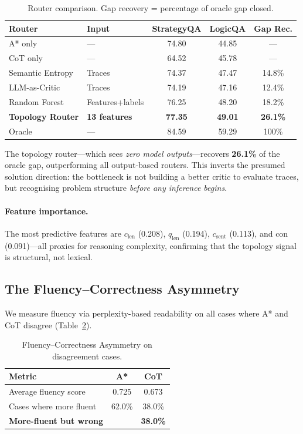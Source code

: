 \documentclass[11pt]{article}
\begin{document}
\begin{table}[t]
\centering
\caption{Router comparison. Gap recovery = percentage of oracle gap closed.}
\label{tab:router}
\small
\begin{tabular}{@{}llccc@{}}
\toprule
\textbf{Router} & \textbf{Input} & \textbf{StrategyQA} & \textbf{LogicQA} & \textbf{Gap Rec.} \\
\midrule
A* only & --- & 74.80 & 44.85 & --- \\
CoT only & --- & 64.52 & 45.78 & --- \\
\midrule
Semantic Entropy & Traces & 74.37 & 47.47 & 14.8\% \\
LLM-as-Critic & Traces & 74.19 & 47.16 & 12.4\% \\
Random Forest & Features+labels & 76.25 & 48.20 & 18.2\% \\
\textbf{Topology Router} & \textbf{13 features} & \textbf{77.35} & \textbf{49.01} & \textbf{26.1\%} \\
\midrule
Oracle & --- & 84.59 & 59.29 & 100\% \\
\bottomrule
\end{tabular}
\end{table}

The topology router---which sees \emph{zero model outputs}---recovers \textbf{26.1\%} of the oracle gap, outperforming all output-based routers. This inverts the presumed solution direction: the bottleneck is not building a better critic to evaluate traces, but recognising problem structure \emph{before any inference begins}.

\paragraph{Feature importance.}
The most predictive features are $c_\text{len}$ (0.208), $q_\text{len}$ (0.194), $c_\text{sent}$ (0.113), and $\mathrm{con}$ (0.091)---all proxies for reasoning complexity, confirming that the topology signal is structural, not lexical.

\subsection{The Fluency--Correctness Asymmetry}
\label{sec:fluency}

We measure fluency via perplexity-based readability on all cases where A* and CoT disagree (Table~\ref{tab:fluency}).

\begin{table}[t]
\centering
\caption{Fluency--Correctness Asymmetry on disagreement cases.}
\label{tab:fluency}
\small
\begin{tabular}{@{}lcc@{}}
\toprule
\textbf{Metric} & \textbf{A*} & \textbf{CoT} \\
\midrule
Average fluency score & 0.725 & 0.673 \\
Cases where more fluent & 62.0\% & 38.0\% \\
\textbf{More-fluent but wrong} & & \textbf{38.0\%} \\
\bottomrule
\end{tabular}
\end{table}
\end{document}
